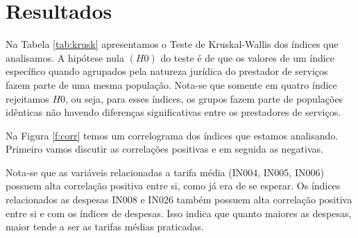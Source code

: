  

\section{Resultados}\label{s:resul}

\begin{multicols}{2}

Na Tabela \ref{tab:krusk} apresentamos o Teste de Kruskal-Wallis dos índices que analisamos. A hipótese nula $(H0)$ do teste é de que os valores de um índice específico quando agrupados pela natureza jurídica do prestador de serviços fazem parte de uma mesma população. Nota-se que somente em quatro índice rejeitamos $H0$, ou seja, para esses índices, os grupos fazem parte de populações idênticas não havendo diferenças significativas entre os prestadores de serviços.

\end{multicols}






\begin{multicols}{2}

Na Figura \ref{f:corr} temos um correlograma dos índices que estamos analisando. Primeiro vamos discutir as correlações positivas e em seguida as negativas.

Nota-se que as variáveis relacionadas a tarifa média (IN004, IN005, IN006) possuem alta correlação positiva entre si, como já era de se esperar. Os índices relacionados as despesas IN008 e IN026 também possuem alta correlação positiva entre si e com os índices de despesas. Isso indica que quanto maiores as despesas, maior tende a ser as tarifas médias praticadas. 


\end{multicols}


